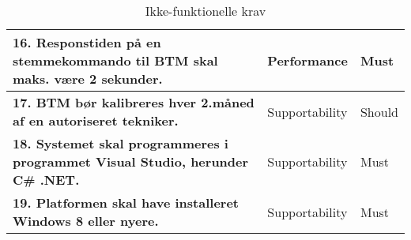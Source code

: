 \begin{table} [htbp]
\begin{tabular}{|p{10cm}|l|l|}
\textbf{16. Responstiden på en stemmekommando til BTM skal maks. være 2 sekunder.} & Performance & Must \\ \hline
\textbf{17. BTM bør kalibreres hver 2.måned af en autoriseret tekniker. } & Supportability & Should \\ \hline
\textbf{18. Systemet skal programmeres i programmet Visual Studio, herunder C\# .NET.} & Supportability & Must \\ \hline
\textbf{19. Platformen skal have installeret Windows 8 eller nyere.} & Supportability & Must \\ \hline

\end{tabular}
\caption{Ikke-funktionelle krav}
\label{tb:ikkefunkkrav} 
\end{table}
